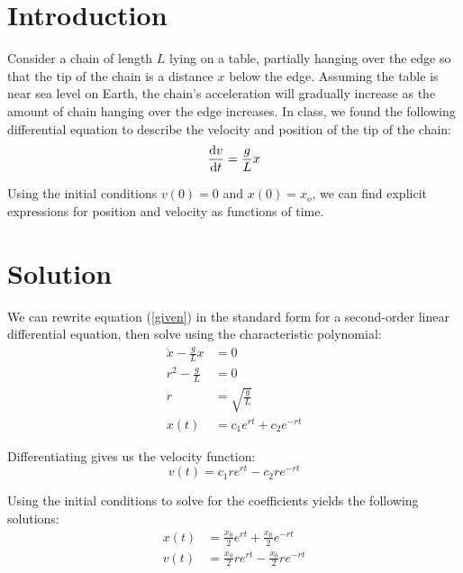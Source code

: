 \documentclass{article}
\begin{document}
\insertTitle

\section{Introduction}

Consider a chain of length $L$ lying on a table, partially hanging over the edge so that the tip of the chain is a distance $x$ below the edge. Assuming the table is near sea level on Earth, the chain's acceleration will gradually increase as the amount of chain hanging over the edge increases. In class, we found the following differential equation to describe the velocity and position of the tip of the chain:
\begin{equation}\label{given}
\dv{v}{t} = \frac{g}{L}x
\end{equation}

Using the initial conditions $v(0) = 0$ and $x(0) = x_o$, we can find explicit expressions for position and velocity as functions of time.

\section{Solution}

We can rewrite equation (\ref{given}) in the standard form for a second-order linear differential equation, then solve using the characteristic polynomial:
\begin{equation*}
\begin{aligned}
\ddot{x} - \frac{g}{L}x &= 0 \\
r^2 - \frac{g}{L} &= 0 \\
r &= \sqrt{\frac{g}{L}} \\
x(t) &= c_1 e^{rt} + c_2 e^{-rt}
\end{aligned}
\end{equation*}

Differentiating gives us the velocity function:
\begin{equation*}
v(t) = c_1 re^{rt} - c_2 re^{-rt}
\end{equation*}

Using the initial conditions to solve for the coefficients yields the following solutions:
\begin{equation}
\begin{aligned}
x(t) &= \frac{x_0}{2}e^{rt} + \frac{x_0}{2}e^{-rt} \\
v(t) &= \frac{x_0}{2}re^{rt} - \frac{x_0}{2}re^{-rt}
\end{aligned}
\end{equation}
\end{document}

